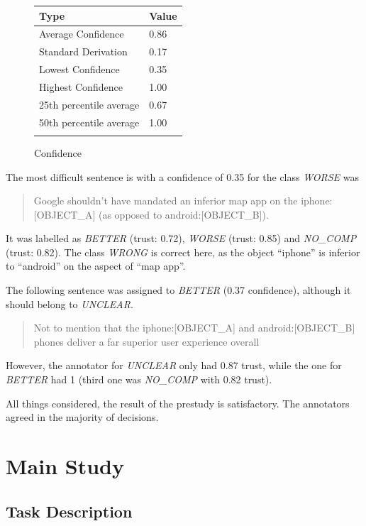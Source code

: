 \begin{figure}[h]
\centering
\caption{Confidence}
\begin{tabular}{@{}ll@{}}
\toprule
Type & Value  \\ \midrule
Average Confidence & 0.86 \\
Standard Derivation & 0.17 \\
Lowest Confidence & 0.35\\
Highest Confidence & 1.00\\
25th percentile average & 0.67\\
50th percentile average & 1.00\\
\bottomrule
\label{pre:conf-table}
\end{tabular}
\end{figure}





The most difficult sentence is with a confidence of 0.35 for the class \emph{WORSE} was
\begin{quote}
Google shouldn't have mandated an inferior map app on the iphone:[OBJECT\_A] (as opposed to android:[OBJECT\_B]).
\end{quote}

It was labelled as \emph{BETTER} (trust: 0.72), \emph{WORSE} (trust: 0.85) and \emph{NO\_COMP} (trust: 0.82). The class \emph{WRONG} is correct here, as the object \enquote{iphone} is inferior to \enquote{android} on the aspect of \enquote{map app}.

The following sentence was assigned to \emph{BETTER} (0.37 confidence), although it should belong to \emph{UNCLEAR}.
\begin{quote}
Not to mention that the iphone:[OBJECT\_A] and android:[OBJECT\_B] phones deliver a far superior user experience overall
\end{quote}
However, the annotator for \emph{UNCLEAR} only had 0.87 trust, while the one for \emph{BETTER} had 1 (third one was \emph{NO\_COMP} with 0.82 trust).\newline

All things considered, the result of the prestudy is satisfactory. The annotators agreed in the majority of decisions. 


\newpage
\section{Main Study}
\subsection{Task Description}
